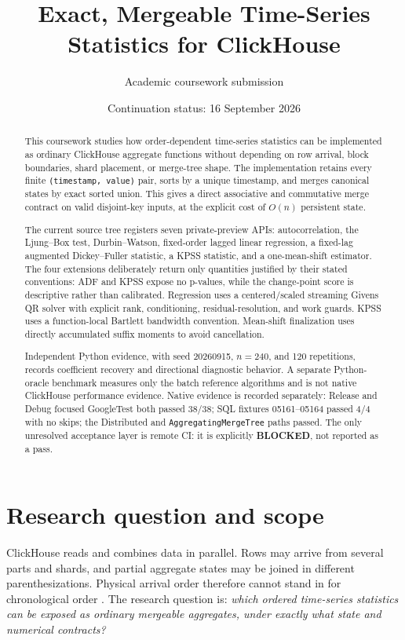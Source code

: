 \documentclass[11pt]{article}
\title{Exact, Mergeable Time-Series Statistics for ClickHouse}
\author{Academic coursework submission}
\date{Continuation status: 16 September 2026}
\begin{document}
\maketitle

\begin{abstract}
This coursework studies how order-dependent time-series statistics can be implemented as ordinary ClickHouse aggregate functions without depending on row arrival, block boundaries, shard placement, or merge-tree shape. The implementation retains every finite \texttt{(timestamp, value)} pair, sorts by a unique timestamp, and merges canonical states by exact sorted union. This gives a direct associative and commutative merge contract on valid disjoint-key inputs, at the explicit cost of $O(n)$ persistent state.

The current source tree registers seven private-preview APIs: autocorrelation, the Ljung--Box test, Durbin--Watson, fixed-order lagged linear regression, a fixed-lag augmented Dickey--Fuller statistic, a KPSS statistic, and a one-mean-shift estimator. The four extensions deliberately return only quantities justified by their stated conventions: ADF and KPSS expose no p-values, while the change-point score is descriptive rather than calibrated. Regression uses a centered/scaled streaming Givens QR solver with explicit rank, conditioning, residual-resolution, and work guards. KPSS uses a function-local Bartlett bandwidth convention. Mean-shift finalization uses directly accumulated suffix moments to avoid cancellation.

Independent Python evidence, with seed 20260915, $n=240$, and 120 repetitions, records coefficient recovery and directional diagnostic behavior. A separate Python-oracle benchmark measures only the batch reference algorithms and is not native ClickHouse performance evidence. Native evidence is recorded separately: Release and Debug focused GoogleTest both passed 38/38; SQL fixtures 05161--05164 passed 4/4 with no skips; the Distributed and \texttt{AggregatingMergeTree} paths passed. The only unresolved acceptance layer is remote CI: it is explicitly \textbf{BLOCKED}, not reported as a pass.
\end{abstract}

\tableofcontents

\section{Research question and scope}

ClickHouse reads and combines data in parallel. Rows may arrive from several parts and shards, and partial aggregate states may be joined in different parenthesizations. Physical arrival order therefore cannot stand in for chronological order \cite{schulze2024clickhouse,clickhouse_mergetree_docs,clickhouse_parts_docs}. The research question is: \emph{which ordered time-series statistics can be exposed as ordinary mergeable aggregates, under exactly what state and numerical contracts?}
\end{document}
